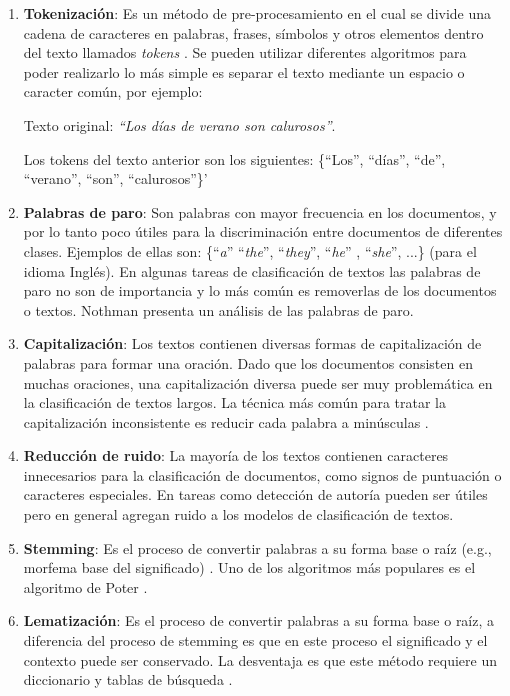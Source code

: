 \begin{enumerate}
\item \textbf{Tokenización}: Es un método de pre-procesamiento en el cual se divide una cadena de caracteres en palabras, frases, símbolos y otros elementos dentro del texto llamados \textit{tokens} \citep{kowsari2019text}. Se pueden utilizar diferentes algoritmos para poder realizarlo lo más simple es separar el texto mediante un espacio o caracter común, por ejemplo:

Texto original: \textit{``Los días de verano son calurosos''}.

Los tokens del texto anterior son los siguientes: \{``Los'',  ``días'', ``de'', ``verano'', ``son'', ``calurosos''\}'

\item \textbf{Palabras de paro}: Son palabras con mayor frecuencia en los documentos, y por lo tanto poco útiles para la discriminación entre documentos de diferentes clases. Ejemplos de ellas son: \{``\textit{a}'' ``\textit{the}'', ``\textit{they}'', ``\textit{he}'' , ``\textit{she}'', ...\} (para el idioma Inglés). En algunas tareas de clasificación de textos las palabras de paro no son de importancia y lo más común es removerlas de los documentos o textos. Nothman \citep{nothman2018stop} presenta un análisis de las palabras de paro.

\item \textbf{Capitalización}: Los textos contienen diversas formas de capitalización de palabras para formar una oración. Dado que los documentos consisten en muchas oraciones, una capitalización diversa puede ser muy problemática en la clasificación de textos largos. La técnica más común para tratar la capitalización inconsistente es reducir cada palabra a minúsculas \citep{kowsari2019text}.

\item \textbf{Reducción de ruido}: La mayoría de los textos contienen caracteres innecesarios para la clasificación de documentos, como signos de puntuación o caracteres especiales. En tareas como detección de autoría pueden ser útiles pero en general agregan ruido a los modelos de clasificación de textos.

\item \textbf{Stemming}: Es el proceso de convertir palabras a su forma base o raíz  (e.g., morfema base del significado) \citep{kamath2019deep}. Uno de los algoritmos más populares es el algoritmo de Poter \citep{porter2001snowball}.

\item \textbf{Lematización}:  Es el proceso de convertir palabras a su forma base o raíz, a diferencia del proceso de stemming es que en este proceso el significado y el contexto puede ser conservado. La desventaja es que este método requiere un diccionario y tablas de búsqueda \citep{kamath2019deep}.


\end{enumerate}
